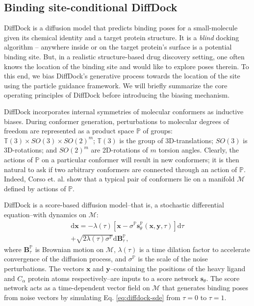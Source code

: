 \documentclass[letterpaper]{article}
\begin{document}
\subsection{Binding site-conditional DiffDock}

DiffDock is a diffusion model that predicts binding poses for a small-molecule given its chemical identity and a target protein structure. It is a {\it blind} docking algorithm -- anywhere inside or on the target protein's surface is a potential binding site. But, in a realistic structure-based drug discovery setting, one often knows the location of the binding site and would like to explore poses therein. To this end, we bias DiffDock's generative process towards the location of the site using the particle guidance framework.\cite{corso2023particle} We will briefly summarize the core operating principles of DiffDock before introducing the biasing mechanism.




DiffDock incorporates internal symmetries of molecular conformers as inductive biases. During conformer generation, perturbations to molecular degrees of freedom are represented as a product space $\mathbb{P}$ of groups: $\mathbb{T}(3) \times SO(3) \times SO(2)^m$; $\mathbb{T}(3)$ is the group of 3D-translations; $SO(3)$ is 3D-rotations; and $SO(2)^m$ are 2D-rotations of $m$ torsion angles. Clearly, the actions of $\mathbb{P}$ on a particular conformer will result in new conformers; it is then natural to ask if two arbitrary conformers are connected through an action of $\mathbb{P}$. Indeed, Corso et. al. show that a typical pair of conformers lie on a manifold $\mathcal{M}$ defined by actions of $\mathbb{P}$.\cite{corso2022diffdock}


DiffDock is a score-based diffusion model\cite{song2020sgm}--that is, a stochastic differential equation--with dynamics on $\mathcal{M}$:
\begin{equation}
    \begin{aligned}
    \label{eq:diffdock-sde}
        \mathrm{d}\mathbf{x} = - \lambda(\tau) 
        \left[ \mathbf{x} - \sigma^{\mathbb{P}}\mathbf{s}^\mathbb{P}_\theta(\mathbf{x}, \mathbf{y}, \tau) \right]
        \mathrm{d}\tau \\+ \sqrt{2 \lambda(\tau) \sigma^{\mathbb{P}}}\mathrm{d}\mathbf{B}^{\mathbb{P}}_\tau,
    \end{aligned}
\end{equation}
where $\mathbf{B}_\tau^{\mathbb{P}}$ is Brownian motion on $\mathcal{M}$, $\lambda(\tau)$ is a time dilation factor to accelerate convergence of the diffusion process, and $\sigma^{\mathbb{P}}$ is the scale of the noise perturbations. The vectors $\mathbf{x}$ and $\mathbf{y}$--containing the positions of the heavy ligand and $C_\alpha$ protein atoms respectively--are inputs to a score network $\mathbf{s}_\theta$. The score network acts as a time-dependent vector field on $\mathcal{M}$ that generates binding poses from noise vectors by simulating Eq. \ref{eq:diffdock-sde} from $\tau = 0$ to $\tau = 1$.
\end{document}
